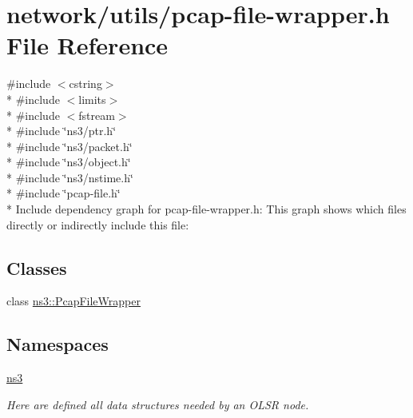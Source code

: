 \hypertarget{pcap-file-wrapper_8h}{}\section{network/utils/pcap-\/file-\/wrapper.h File Reference}
\label{pcap-file-wrapper_8h}
{\ttfamily \#include $<$cstring$>$}\\*
{\ttfamily \#include $<$limits$>$}\\*
{\ttfamily \#include $<$fstream$>$}\\*
{\ttfamily \#include \char`\"{}ns3/ptr.\+h\char`\"{}}\\*
{\ttfamily \#include \char`\"{}ns3/packet.\+h\char`\"{}}\\*
{\ttfamily \#include \char`\"{}ns3/object.\+h\char`\"{}}\\*
{\ttfamily \#include \char`\"{}ns3/nstime.\+h\char`\"{}}\\*
{\ttfamily \#include \char`\"{}pcap-\/file.\+h\char`\"{}}\\*
Include dependency graph for pcap-\/file-\/wrapper.h\+:
This graph shows which files directly or indirectly include this file\+:
\subsection*{Classes}
\begin{DoxyCompactItemize}
\item 
class \hyperlink{classns3_1_1PcapFileWrapper}{ns3\+::\+Pcap\+File\+Wrapper}
\end{DoxyCompactItemize}
\subsection*{Namespaces}
\begin{DoxyCompactItemize}
\item 
 \hyperlink{namespacens3}{ns3}
\begin{DoxyCompactList}\small\item\em Here are defined all data structures needed by an O\+L\+SR node. \end{DoxyCompactList}\end{DoxyCompactItemize}
